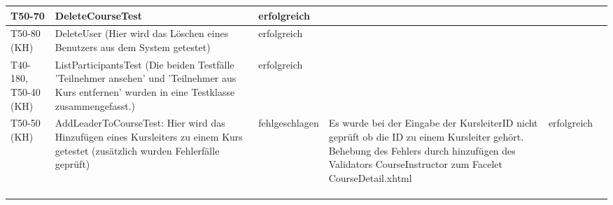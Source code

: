 \begin{landscape}
\begin{tabular}{|p{2.0cm} |p{5.0cm}|p{3.0cm}|p{5.0cm}|p{4.0cm}|p{4.0cm}|}
			\hline T50-70 & DeleteCourseTest & erfolgreich &        &         &       \\
			\hline T50-80 (KH)   &   DeleteUser (Hier wird das Löschen eines Benutzers aus dem System getestet)       &    erfolgreich      &        &         &       \\
			
			\hline  T40-180, T50-40 (KH) & ListParticipantsTest (Die beiden Testfälle 'Teilnehmer ansehen' und 'Teilnehmer aus Kurs entfernen' wurden in eine Testklasse zusammengefasst.) &     erfolgreich     &        &         &       \\
			\hline  T50-50 (KH) &  AddLeaderToCourseTest: Hier wird das Hinzufügen eines Kursleiters zu einem Kurs getestet (zusätzlich wurden Fehlerfälle geprüft) &  fehlgeschlagen & Es wurde bei der Eingabe der KursleiterID nicht geprüft ob die ID zu einem Kursleiter gehört. Behebung des Fehlers durch hinzufügen des Validators CourseInstructor zum Facelet CourseDetail.xhtml  &  erfolgreich       &       \\
			\hline       &          &          &        &         &       \\
			\hline       &          &          &        &         &       \\
			\hline       &          &          &        &         &       \\
			\hline 
		\end{tabular} \ \\
		\ \\
	
\end{landscape}